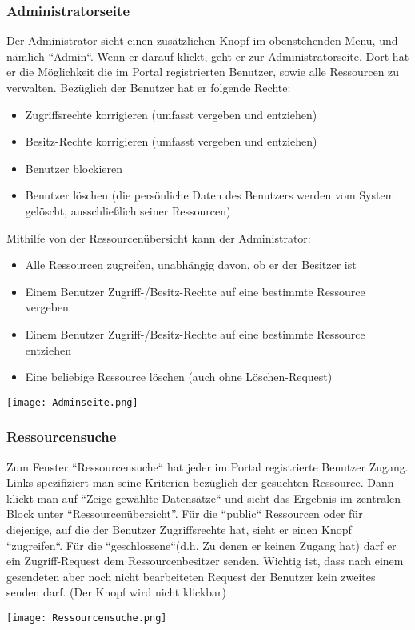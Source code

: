 \documentclass[parskip=full,11pt]{scrartcl}
\begin{document}
\subsubsection*{Administratorseite}
Der Administrator sieht einen zusätzlichen Knopf im obenstehenden Menu, und nämlich ``Admin``. Wenn er darauf klickt, geht er zur Administratorseite. Dort hat er die Möglichkeit die im Portal registrierten Benutzer, sowie alle Ressourcen zu verwalten. Bezüglich der Benutzer hat er folgende Rechte:
\begin{itemize}
	\item Zugriffsrechte korrigieren (umfasst vergeben und entziehen)
	\item Besitz-Rechte korrigieren (umfasst vergeben und entziehen)
	\item Benutzer blockieren
	\item Benutzer löschen (die persönliche Daten des Benutzers werden vom System gelöscht, ausschließlich seiner Ressourcen)
\end{itemize}  
 Mithilfe von der Ressourcenübersicht kann der Administrator:
 \begin{itemize}
 	\item Alle Ressourcen zugreifen, unabhängig davon, ob er der Besitzer ist
 	\item Einem Benutzer Zugriff-/Besitz-Rechte auf eine bestimmte Ressource vergeben
 	\item Einem Benutzer Zugriff-/Besitz-Rechte auf eine bestimmte Ressource entziehen
 	\item Eine beliebige Ressource löschen (auch ohne Löschen-Request)
 \end{itemize}
	\begin{center}
	\texttt{[image: Adminseite.png]}
	\end{center}
	
\subsubsection*{Ressourcensuche}
Zum Fenster ``Ressourcensuche`` hat jeder im Portal registrierte Benutzer Zugang. Links spezifiziert man seine Kriterien bezüglich der gesuchten Ressource. Dann klickt man auf 
``Zeige gewählte Datensätze`` und sieht das Ergebnis im zentralen Block unter “Ressourcenübersicht”. Für die ``public`` Ressourcen oder für diejenige, auf die der Benutzer Zugriffsrechte hat, sieht er einen Knopf ``zugreifen``. Für die ``geschlossene``(d.h. Zu denen er keinen Zugang hat) darf er ein Zugriff-Request dem Ressourcenbesitzer senden. Wichtig ist, dass nach einem gesendeten aber noch nicht bearbeiteten Request der Benutzer kein zweites senden darf. (Der Knopf wird nicht klickbar)
	\begin{center}
	\texttt{[image: Ressourcensuche.png]}
	\end{center}
	
\end{document}
